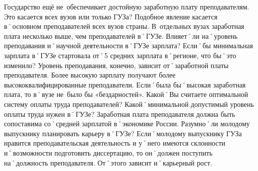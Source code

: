 \begin{drama}
	\michaelspeaks Государство ещё не~обеспечивает достойную заработную плату преподавателям. 
	\maxspeaks Это касается всех вузов или только ГУЗа?
	\michaelspeaks Подобное явление касается в˚основном преподавателей всех вузов страны. В~отдельных вузах заработная плата несколько выше, чем преподавателей в˚ГУЗе.
	\maxspeaks Влияет˚ли на˚уровень преподавания и˚научной деятельности в˚ГУЗе зарплата? Если˚бы минимальная зарплата в˚ГУЗе стартовала от˚5 средних зарплата в˚регионе, что бы˚это изменило?
	\michaelspeaks Уровень преподавания, конечно, зависит от˚заработной платы преподавателя. Более высокую зарплату получают более высококвалифицированные преподаватели. Если˚была бы˚высокая заработная плата, то в˚вузе не~было бы «бездарностей».
	\maxspeaks Какой˚Вы считаете оптимальной систему оплаты труда преподавателей? Какой˚минимальной допустимый уровень оплаты труда нужен в˚ГУЗе?
	\michaelspeaks Заработная плата преподавателя должна быть сопоставима со˚средней зарплатой в˚экономике России.
	\maxspeaks Разумно˚ли молодому выпускнику планировать карьеру в˚ГУЗе?
	\michaelspeaks Если˚молодому выпускнику ГУЗа нравится преподавательская деятельность и у˚него имеются склонности и˚возможности подготовить диссертацию, то он˚должен поступить на˚должность преподавателя. От˚этого зависит и˚карьерный рост.	
	
	\pagebreak
	

\end{drama}
